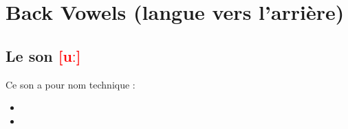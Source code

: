 \section{Back Vowels (langue vers l'arrière)}\label{sec:backvow}


\subsection{ Le son \textcolor{red}{[uː]} }\label{sec:ulong}

Ce son a pour nom technique :

\begin{itemize}
\item {}
\item {}
\end{itemize}

\indicsound


